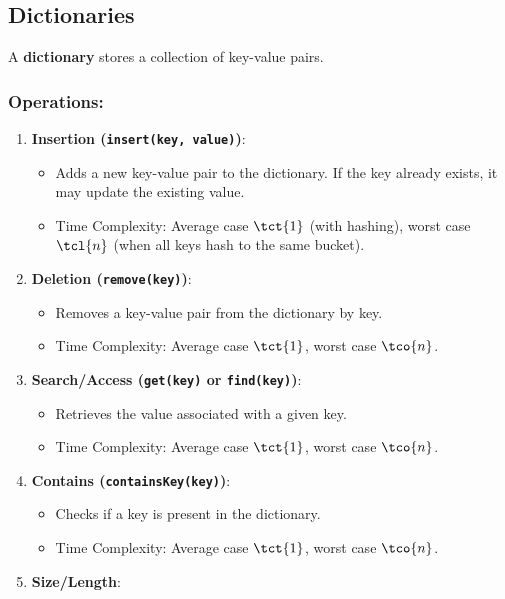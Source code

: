 \newpage
\subsection{Dictionaries}
A \textbf{dictionary} stores a collection of key-value pairs.

\subsubsection{Operations:}

\begin{enumerate}
    \item \textbf{Insertion (\texttt{insert(key,\ value)})}:
          \begin{itemize}
              \item Adds a new key-value pair to the dictionary. If the key already exists, it may update the existing value.
              \item Time Complexity: Average case $\tct{1}$ (with hashing), worst case $\tcl{n}$ (when all keys hash to the same bucket).
          \end{itemize}
    \item \textbf{Deletion (\texttt{remove(key)})}:
          \begin{itemize}
              \item Removes a key-value pair from the dictionary by key.
              \item Time Complexity: Average case $\tct{1}$, worst case $\tco{n}$.
          \end{itemize}
    \item \textbf{Search/Access (\texttt{get(key)} or \texttt{find(key)})}:
          \begin{itemize}
              \item Retrieves the value associated with a given key.
              \item Time Complexity: Average case $\tct{1}$, worst case $\tco{n}$.
          \end{itemize}
    \item \textbf{Contains (\texttt{containsKey(key)})}:
          \begin{itemize}
              \item Checks if a key is present in the dictionary.
              \item Time Complexity: Average case $\tct{1}$, worst case $\tco{n}$.
          \end{itemize}
    \item \textbf{Size/Length}:

\end{enumerate}

